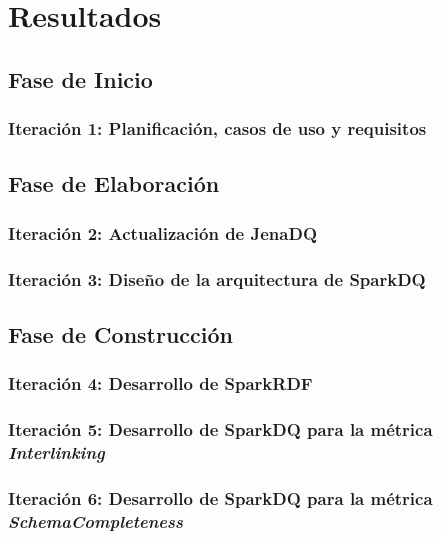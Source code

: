 \chapter{Resultados}
\label{chap:resultados}

\section{Fase de Inicio}

\subsection{Iteración 1: Planificación, casos de uso y requisitos}



\section{Fase de Elaboración}

\subsection{Iteración 2: Actualización de JenaDQ}



\subsection{Iteración 3: Diseño de la arquitectura de SparkDQ}



\section{Fase de Construcción}

\subsection{Iteración 4: Desarrollo de SparkRDF}



\subsection{Iteración 5: Desarrollo de SparkDQ para la métrica \textit{Interlinking}}



\subsection{Iteración 6: Desarrollo de SparkDQ para la métrica \textit{SchemaCompleteness}}

